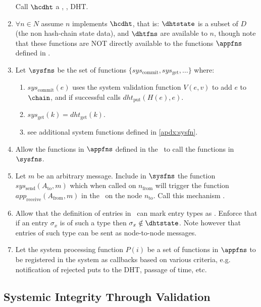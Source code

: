 \documentclass[twocolumn,showpacs,%
  nofootinbib,aps,superscriptaddress,%
  eqsecnum,prd,notitlepage,showkeys,10pt]{revtex4-1}
\begin{document}
\begin{enumerate}
\begin{enumerate}
\end{enumerate}

Call $\hcdht$ a , ,  DHT.

\item $\forall n \in N$ assume $n$ implements $\hcdht$, that is: $\dhtstate$ is a subset of $D$ (the non hash-chain state data), and $\dhtfns$ are available to $n$, though note that these functions are NOT directly available to the functions $\appfns$ defined in \hcdna.

\item Let $\sysfns$ be the set of functions $\{sys_\text{commit},sys_\text{get}, \dots\}$ where:
\begin{enumerate}
\item $sys_\text{commit}(e)$ uses the system validation function $V(e,v)$ to add $e$ to $\chain$, and if successful calls $dht_\text{put}(H(e),e)$.
\item $sys_\text{get}(k) = dht_\text{get}(k)$.
\item see additional system functions defined in \ref{apdx:sysfn}.
\end{enumerate}

\item Allow the functions in $\appfns$ defined in the \hcdna\ to call the functions in $\sysfns$.
\item Let $m$ be an arbitrary message. Include in $\sysfns$ the function $sys_\text{send}(A_\text{to},m)$ which when called on $n_\text{from}$ will trigger the function $app_\text{receive}(A_\text{from},m)$ in the \hcdna\ on the node $n_\text{to}$. Call this mechanism .
\item \label{private} Allow that the definition of entries in \hcdna\ can mark entry types as . Enforce that if an entry $\sigma_x$ is of such a type then $\sigma_x \notin \dhtstate$. Note however that entries of such type can be sent as node-to-node messages.
\item Let the system processing function $P(i)$ be a set of functions in $\appfns$ to be registered in the system as callbacks based on various criteria, e.g. notification of rejected puts to the DHT, passage of time, etc.
\end{enumerate}

\subsection{Systemic Integrity Through Validation}
\label{sec:integrity}
\end{document}
